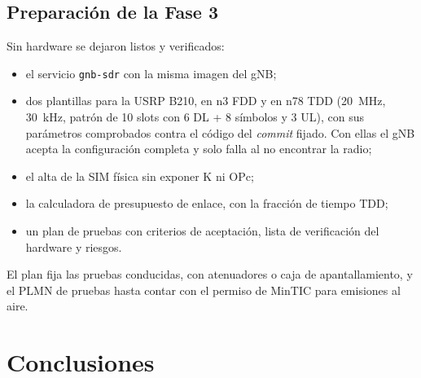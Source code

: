 \documentclass[conference]{IEEEtran}
\begin{document}
\subsection{Preparación de la Fase 3}
Sin hardware se dejaron listos y verificados:
\begin{itemize}
  \item el servicio \texttt{gnb-sdr} con la misma imagen del gNB;
  \item dos plantillas para la USRP B210, en n3 FDD y en n78 TDD (20~MHz, 30~kHz, patrón de 10 slots con 6 DL + 8 símbolos y 3 UL), con sus parámetros comprobados contra el código del \textit{commit} fijado. Con ellas el gNB acepta la configuración completa y solo falla al no encontrar la radio;
  \item el alta de la SIM física sin exponer K ni OPc;
  \item la calculadora de presupuesto de enlace, con la fracción de tiempo TDD;
  \item un plan de pruebas con criterios de aceptación, lista de verificación del hardware y riesgos.
\end{itemize}
El plan fija las pruebas conducidas, con atenuadores o caja de apantallamiento, y el PLMN de pruebas hasta contar con el permiso de MinTIC para emisiones al aire.

\section{Conclusiones}
\label{sec:concl}
\end{document}
